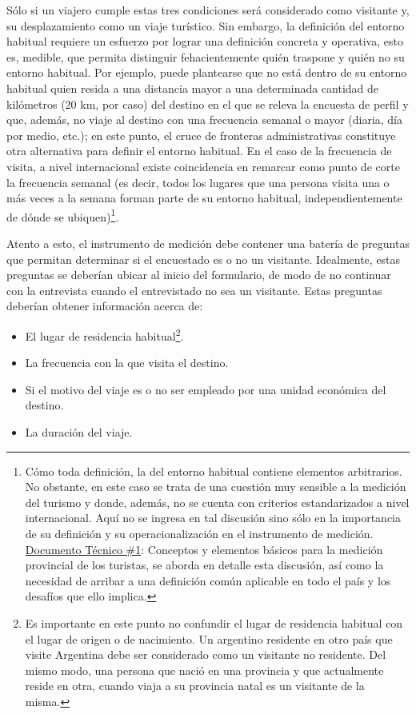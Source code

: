\documentclass[
]{book}
\begin{document}
Sólo si un viajero cumple estas tres condiciones será considerado como visitante y, su desplazamiento como un viaje turístico. Sin embargo, la definición del entorno habitual requiere un esfuerzo por lograr una definición concreta y operativa, esto es, medible, que permita distinguir fehacientemente quién traspone y quién no su entorno habitual. Por ejemplo, puede plantearse que no está dentro de su entorno habitual quien resida a una distancia mayor a una determinada cantidad de kilómetros (20 km, por caso) del destino en el que se releva la encuesta de perfil y que, además, no viaje al destino con una frecuencia semanal o mayor (diaria, día por medio, etc.); en este punto, el cruce de fronteras administrativas constituye otra alternativa para definir el entorno habitual. En el caso de la frecuencia de visita, a nivel internacional existe coincidencia en remarcar como punto de corte la frecuencia semanal (es decir, todos los lugares que una persona visita una o más veces a la semana forman parte de su entorno habitual, independientemente de dónde se ubiquen)\footnote{Cómo toda definición, la del entorno habitual contiene elementos arbitrarios. No obstante, en este caso se trata de una cuestión muy sensible a la medición del turismo y donde, además, no se cuenta con criterios estandarizados a nivel internacional. Aquí no se ingresa en tal discusión sino sólo en la importancia de su definición y su operacionalización en el instrumento de medición. \href{https://dnme-minturdep.github.io/DT1_medicion_turismo/}{Documento Técnico \#1}: Conceptos y elementos básicos para la medición provincial de los turistas, se aborda en detalle esta discusión, así como la necesidad de arribar a una definición común aplicable en todo el país y los desafíos que ello implica.}.

Atento a esto, el instrumento de medición debe contener una batería de preguntas que permitan determinar si el encuestado es o no un visitante. Idealmente, estas preguntas se deberían ubicar al inicio del formulario, de modo de no continuar con la entrevista cuando el entrevistado no sea un visitante. Estas preguntas deberían obtener información acerca de:

\begin{itemize}
\item
  El lugar de residencia habitual\footnote{Es importante en este punto no confundir el lugar de residencia habitual con el lugar de origen o de nacimiento. Un argentino residente en otro país que visite Argentina debe ser considerado como un visitante no residente. Del mismo modo, una persona que nació en una provincia y que actualmente reside en otra, cuando viaja a su provincia natal es un visitante de la misma.}.
\item
  La frecuencia con la que visita el destino.
\item
  Si el motivo del viaje es o no ser empleado por una unidad económica del destino.
\item
  La duración del viaje.
\end{itemize}
\end{document}
